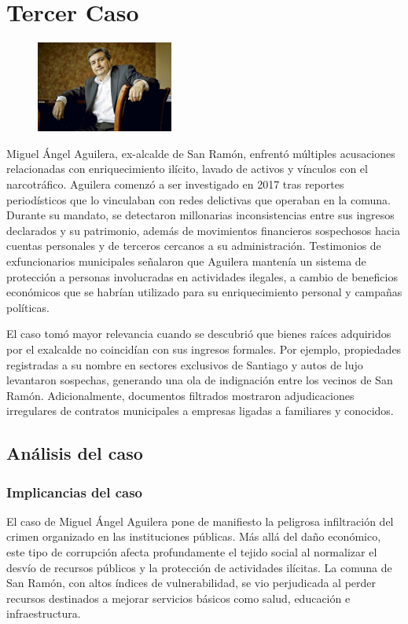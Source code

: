 \documentclass[letter,12pt]{article}
\begin{document}
	\section{Tercer Caso}
	\begin{figure}
		\centering
		\includegraphics[width=0.4\textwidth]{figures/Miguel}
	\end{figure}
	Miguel Ángel Aguilera, ex-alcalde de San Ramón, enfrentó múltiples acusaciones relacionadas con enriquecimiento ilícito, lavado de activos y vínculos con el narcotráfico. Aguilera comenzó a ser investigado en 2017 tras reportes periodísticos que lo vinculaban con redes delictivas que operaban en la comuna. Durante su mandato, se detectaron millonarias inconsistencias entre sus ingresos declarados y su patrimonio, además de movimientos financieros sospechosos hacia cuentas personales y de terceros cercanos a su administración. Testimonios de exfuncionarios municipales señalaron que Aguilera mantenía un sistema de protección a personas involucradas en actividades ilegales, a cambio de beneficios económicos que se habrían utilizado para su enriquecimiento personal y campañas políticas.\cite{miguel}
	
	El caso tomó mayor relevancia cuando se descubrió que bienes raíces adquiridos por el exalcalde no coincidían con sus ingresos formales. Por ejemplo, propiedades registradas a su nombre en sectores exclusivos de Santiago y autos de lujo levantaron sospechas, generando una ola de indignación entre los vecinos de San Ramón. Adicionalmente, documentos filtrados mostraron adjudicaciones irregulares de contratos municipales a empresas ligadas a familiares y conocidos.
	
	\subsection{Análisis del caso}
	\subsubsection{Implicancias del caso}
	El caso de Miguel Ángel Aguilera pone de manifiesto la peligrosa infiltración del crimen organizado en las instituciones públicas. Más allá del daño económico, este tipo de corrupción afecta profundamente el tejido social al normalizar el desvío de recursos públicos y la protección de actividades ilícitas. La comuna de San Ramón, con altos índices de vulnerabilidad, se vio perjudicada al perder recursos destinados a mejorar servicios básicos como salud, educación e infraestructura.
	
\end{document}
